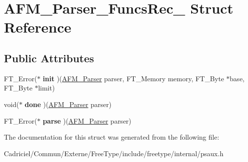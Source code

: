 \hypertarget{struct_a_f_m___parser___funcs_rec__}{\section{A\-F\-M\-\_\-\-Parser\-\_\-\-Funcs\-Rec\-\_\- Struct Reference}
\label{struct_a_f_m___parser___funcs_rec__}
}
\subsection*{Public Attributes}
\begin{DoxyCompactItemize}
\item 
\hypertarget{struct_a_f_m___parser___funcs_rec___a7d5c1422c71ef00984f1207ebfb0b082}{F\-T\-\_\-\-Error($\ast$ {\bfseries init} )(\hyperlink{struct_a_f_m___parser_rec__}{A\-F\-M\-\_\-\-Parser} parser, F\-T\-\_\-\-Memory memory, F\-T\-\_\-\-Byte $\ast$base, F\-T\-\_\-\-Byte $\ast$limit)}\label{struct_a_f_m___parser___funcs_rec___a7d5c1422c71ef00984f1207ebfb0b082}

\item 
\hypertarget{struct_a_f_m___parser___funcs_rec___af4e8bc33b14d14b47d13caf0a2449d1b}{void($\ast$ {\bfseries done} )(\hyperlink{struct_a_f_m___parser_rec__}{A\-F\-M\-\_\-\-Parser} parser)}\label{struct_a_f_m___parser___funcs_rec___af4e8bc33b14d14b47d13caf0a2449d1b}

\item 
\hypertarget{struct_a_f_m___parser___funcs_rec___a2cd41be89cf12f9227c6f18220cbe2f3}{F\-T\-\_\-\-Error($\ast$ {\bfseries parse} )(\hyperlink{struct_a_f_m___parser_rec__}{A\-F\-M\-\_\-\-Parser} parser)}\label{struct_a_f_m___parser___funcs_rec___a2cd41be89cf12f9227c6f18220cbe2f3}

\end{DoxyCompactItemize}


The documentation for this struct was generated from the following file\-:\begin{DoxyCompactItemize}
\item 
Cadriciel/\-Commun/\-Externe/\-Free\-Type/include/freetype/internal/psaux.\-h\end{DoxyCompactItemize}
